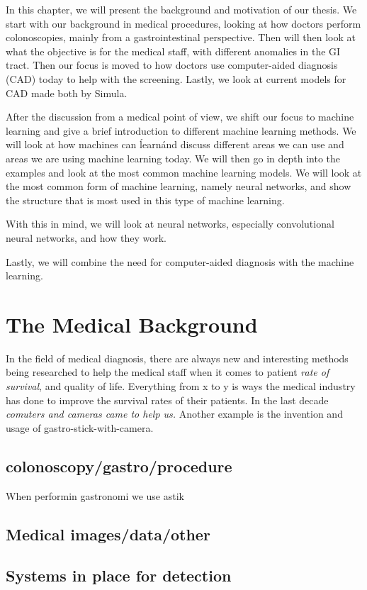 In this chapter, we will present the background and motivation of our thesis.
We start with our background in medical procedures, looking at how doctors perform colonoscopies, mainly from a gastrointestinal perspective.
Then will then look at what the objective is for the medical staff, with different anomalies in the GI tract. Then our focus is moved to how doctors use computer-aided diagnosis (CAD) today to help with the screening. Lastly, we look at current models for CAD made both by Simula.

After the discussion from a medical point of view, we shift our focus to machine learning and give a brief introduction to different machine learning methods. We will look at how machines can \'learn\' and discuss different areas we can use and areas we are using machine learning today.
We will then go in depth into the examples and look at the most common machine learning models. We will look at the most common form of machine learning, namely neural networks, and show the structure that is most used in this type of machine learning. 

 With this in mind, we will look
at neural networks, especially convolutional neural networks, and how they work.

Lastly, we will combine the need for computer-aided diagnosis with the machine learning.
\section{The Medical Background}
In the field of medical diagnosis, there are always new and interesting methods being researched to help the medical staff when it comes to patient \textit{rate of survival}, and quality of life. 
Everything from x to y is ways the medical industry has done to improve the survival rates of their patients. 
In the last decade \textit{comuters and cameras came to help us.}
Another example is the invention and usage of gastro-stick-with-camera.
\subsection{colonoscopy/gastro/procedure}
When performin gastronomi we use astik
\subsection{Medical images/data/other}
    
\subsection{Systems in place for detection}
